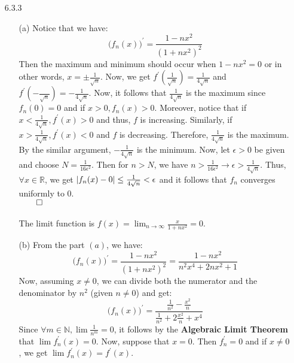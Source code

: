 \documentclass[11pt]{article}
\DeclarePairedDelimiter\abs{\lvert}{\rvert}%
\newcommand{\nats}{\mathbb{N}}
\newcommand{\reals}{\mathbb{R}}
\begin{document}
\begin{itemize}
    \item[6.3.3]
        \begin{itemize}
            \item[(a)]
                Notice that we have:
                \begin{equation*}
                    \Big(f_n(x)\Big)^\prime = \frac{1 - nx^2}{(1 + nx^2)^2}
                \end{equation*}
                Then the maximum and minimum should occur when $1 - nx^2 = 0$
                or in other words, $x = \pm \frac{1}{\sqrt{n}}$. Now, we get
                $f^\prime(\frac{1}{\sqrt{n}}) = \frac{1}{4\sqrt{n}}$ and
                $f^\prime(-\frac{}{\sqrt{n}}) = -\frac{1}{4\sqrt{n}}$. Now, it
                follows that $\frac{1}{4\sqrt{n}}$ is the maximum since $f_n(0)
                = 0$ and if $x > 0, f_n(x) > 0$. Moreover, notice that if $x <
                \frac{1}{4\sqrt{n}}, f^\prime(x) > 0$ and thus, $f$ is
                increasing. Similarly, if $x > \frac{1}{4\sqrt{n}}, f^\prime(x)
                < 0$ and $f$ is decreasing. Therefore, $\frac{1}{4\sqrt{n}}$ is
                the maximum. By the similar argument, $-\frac{1}{4\sqrt{n}}$ is
                the minimum. Now, let $\epsilon > 0$ be given and choose $N =
                \frac{1}{16\epsilon^2}$. Then for $n > N$, we have $n >
                \frac{1}{16\epsilon^2} \to \epsilon > \frac{1}{4\sqrt{n}}$.
                Thus, $\forall x \in \reals$, we get $\abs{f_n(x) - 0} \leq
                \frac{1}{4\sqrt{n}} < \epsilon$ and it follows that $f_n$
                converges uniformly to 0.\\
                $\qed$
                \\
                \\
                The limit function is $f(x) = \lim_{n \to \infty}{\frac{x}{1 +
                nx^2}} = 0$.

            \item[(b)]
                From the part $(a)$, we have:
                \begin{equation*}
                    \Big(f_n(x)\Big)^\prime = \frac{1 - nx^2}{(1 + nx^2)^2}
                        = \frac{1 - nx^2}{n^2x^4 + 2nx^2 + 1}
                \end{equation*}
                Now, assuming $x \neq 0$, we can divide both the numerator and
                the denominator by $n^2$ (given $n \neq 0$) and get:
                \begin{equation*}
                    \Big(f_n(x)\Big)^\prime = \frac{\frac{1}{n^2} -
                    \frac{x^2}{n}}{\frac{1}{n^2} +2\frac{x^2}{n} + x^4}
                \end{equation*}
                Since $\forall m \in \nats, \lim{\frac{1}{n^m}} = 0$, it
                follows by the \textbf{Algebraic Limit Theorem} that
                $\lim{f^\prime_n(x)} = 0$. Now, suppose that $x = 0$. Then
                $f^\prime_n = 0$ and if $x \neq 0$, we get $\lim{f^\prime_n(x)}
                = f^\prime(x)$.
        \end{itemize}


\end{itemize}
\end{document}
